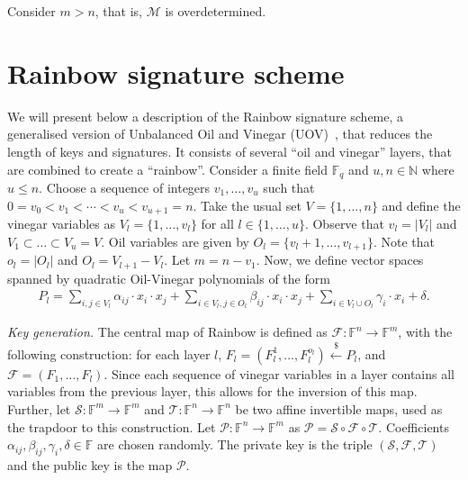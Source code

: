\documentclass[openright]{report}
\newcommand{\random}{\stackrel{\$}{\longleftarrow}}
\begin{document}
Consider $m > n$, that is, $\mathcal{M}$ is overdetermined. 


\section{Rainbow signature scheme}\label{sec:scheme}

We will present below a description of the Rainbow signature scheme, a
generalised version of Unbalanced Oil and Vinegar
(UOV)~\cite{Kipnis:199904:inproc}, that reduces the length of keys and
signatures. It consists of several ``oil and vinegar'' layers, that are
combined to create a ``rainbow''. Consider a finite field $\mathbb{F}_{q}$ and
$u, n \in \mathbb{N}$ where $u \leq n$. Choose a sequence of integers
$v_{1}, \dots, v_{u}$ such that
$0 = v_{0} < v_{1} < \cdots < v_{u} < v_{u + 1} = n$. Take the usual set
$V = \{1, \dots, n\}$ and define the vinegar variables as
$V_{l} = \{1, \dots, v_{l}\}$ for all $l \in \{1, \dots, u\}$. Observe that
$v_{l} = |V_{l}|$ and $V_{1} \subset \dots \subset V_{u} = V$. Oil variables
are given by $O_{l} = \{v_{l} + 1, \dots, v_{l + 1}\}$. Note that
$o_{l} = |O_{l}|$ and $O_{l} = V_{l + 1} - V_{l}$. Let $m = n - v_{1}$. Now,
we define vector spaces spanned by quadratic Oil-Vinegar polynomials of the
form
\begin{align}
  P_{l} = \sum_{i, j \in V_{l}} \alpha_{ij} \cdot x_{i} \cdot x_{j}
    + \sum_{i \in V_{l}, j \in O_{l}} \beta_{ij} \cdot x_{i} \cdot x_{j}
    + \sum_{i \in V_{l} \cup O_{l}} \gamma_{i} \cdot x_{i} + \delta.
\end{align}

\emph{Key generation.} The central map of Rainbow is defined as
$\mathcal{F} : \mathbb{F}^{n} \longrightarrow \mathbb{F}^{m}$, with the
following construction: for each layer $l$,
$F_{l} = (F_{l}^{1}, \dots, F_{l}^{o_{l}}) \random{} P_{l}$,
and $\mathcal{F} = (F_{1}, \dots, F_{l})$. Since each sequence of vinegar
variables in a layer contains all variables from the previous layer, this
allows for the inversion of this map. Further, let
$\mathcal{S} : \mathbb{F}^{m} \longrightarrow \mathbb{F}^{m}$ and
$\mathcal{T} : \mathbb{F}^{n} \longrightarrow \mathbb{F}^{n}$ be two affine
invertible maps, used as the trapdoor to this construction. Let
$\mathcal{P} : \mathbb{F}^{n} \longrightarrow \mathbb{F}^{m}$ as
$\mathcal{P} = \mathcal{S} \circ \mathcal{F} \circ \mathcal{T}$.
Coefficients $\alpha_{ij}, \beta_{ij}, \gamma_{i}, \delta \in \mathbb{F}$ are
chosen randomly. The private key is the triple
$(\mathcal{S}, \mathcal{F}, \mathcal{T})$ and the public key is the map
$\mathcal{P}$.
\end{document}
